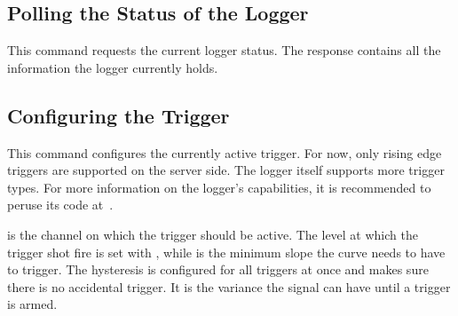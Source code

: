 \subsection{Polling the Status of the Logger} %
\label{subsec:devguide:server:polling_logger}

This command  requests the current  logger status.  The response  contains all
the information the logger currently holds.

\vfill
{}
\vfill

\clearpage
\subsection{Configuring the Trigger} %
\label{subsec:devguide:server:configuring_trigger}

This command  configures the currently  active trigger.  For now,  only rising
edge triggers  are supported  on the server  side. The logger  itself supports
more trigger types. For  more information on the logger's  capabilities, it is
recommended to peruse its code at~\cite{pita:github:huesser:zynq-logger}.

 is the channel on which the trigger should be active. The level
at which the trigger shot fire is set with , while  is
the  minimum slope  the  curve needs  to have  to  trigger. The hysteresis  is
configured for  all triggers  at once  and makes sure  there is  no accidental
trigger. It is the variance the signal can have until a trigger is armed.

\vfill
{}
\vfill


